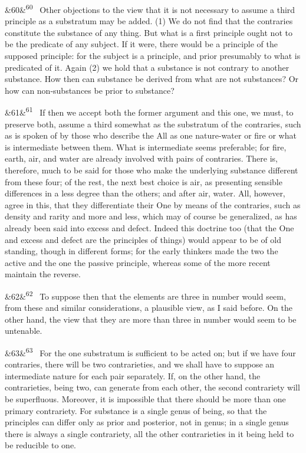 \documentclass[12pt]{article}
\newcommand{\para}[1][]{\par\noindent\ifx&#1&\else\textsuperscript{\footnotesize #1}~\fi}
\begin{document}
\para[60] Other objections to the view that it is not necessary to assume a third principle as a substratum may be added. (1) We do not find that the contraries constitute the substance of any thing. But what is a first principle ought not to be the predicate of any subject. If it were, there would be a principle of the supposed principle: for the subject is a principle, and prior presumably to what is predicated of it. Again (2) we hold that a substance is not contrary to another substance. How then can substance be derived from what are not substances? Or how can non-substances be prior to substance?

\para[61] If then we accept both the former argument and this one, we must, to preserve both, assume a third somewhat as the substratum of the contraries, such as is spoken of by those who describe the All as one nature-water or fire or what is intermediate between them. What is intermediate seems preferable; for fire, earth, air, and water are already involved with pairs of contraries. There is, therefore, much to be said for those who make the underlying substance different from these four; of the rest, the next best choice is air, as presenting sensible differences in a less degree than the others; and after air, water. All, however, agree in this, that they differentiate their One by means of the contraries, such as density and rarity and more and less, which may of course be generalized, as has already been said into excess and defect. Indeed this doctrine too (that the One and excess and defect are the principles of things) would appear to be of old standing, though in different forms; for the early thinkers made the two the active and the one the passive principle, whereas some of the more recent maintain the reverse.

\para[62] To suppose then that the elements are three in number would seem, from these and similar considerations, a plausible view, as I said before. On the other hand, the view that they are more than three in number would seem to be untenable.

\para[63] For the one substratum is sufficient to be acted on; but if we have four contraries, there will be two contrarieties, and we shall have to suppose an intermediate nature for each pair separately. If, on the other hand, the contrarieties, being two, can generate from each other, the second contrariety will be superfluous. Moreover, it is impossible that there should be more than one primary contrariety. For substance is a single genus of being, so that the principles can differ only as prior and posterior, not in genus; in a single genus there is always a single contrariety, all the other contrarieties in it being held to be reducible to one.
\end{document}
